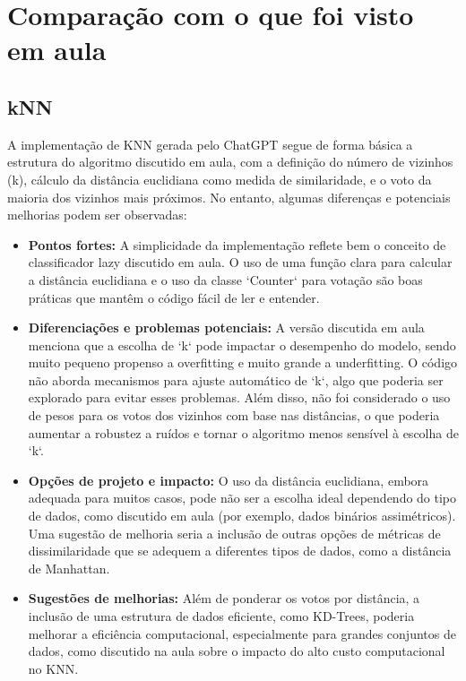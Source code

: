 \documentclass[12pt]{article}
\begin{document}
\section{Comparação com o que foi visto em aula}
\label{sec:comparacao}

\subsection{kNN}

A implementação de KNN gerada pelo ChatGPT segue de forma básica a estrutura do algoritmo discutido em aula, com a definição do número de vizinhos (k), cálculo da distância euclidiana como medida de similaridade, e o voto da maioria dos vizinhos mais próximos. No entanto, algumas diferenças e potenciais melhorias podem ser observadas:

\begin{itemize}
    \item \textbf{Pontos fortes:} A simplicidade da implementação reflete bem o conceito de classificador lazy discutido em aula. O uso de uma função clara para calcular a distância euclidiana e o uso da classe `Counter` para votação são boas práticas que mantêm o código fácil de ler e entender.
    
    \item \textbf{Diferenciações e problemas potenciais:} A versão discutida em aula menciona que a escolha de `k` pode impactar o desempenho do modelo, sendo muito pequeno propenso a overfitting e muito grande a underfitting. O código não aborda mecanismos para ajuste automático de `k`, algo que poderia ser explorado para evitar esses problemas. Além disso, não foi considerado o uso de pesos para os votos dos vizinhos com base nas distâncias, o que poderia aumentar a robustez a ruídos e tornar o algoritmo menos sensível à escolha de `k`.

    \item \textbf{Opções de projeto e impacto:} O uso da distância euclidiana, embora adequada para muitos casos, pode não ser a escolha ideal dependendo do tipo de dados, como discutido em aula (por exemplo, dados binários assimétricos). Uma sugestão de melhoria seria a inclusão de outras opções de métricas de dissimilaridade que se adequem a diferentes tipos de dados, como a distância de Manhattan.
    
    \item \textbf{Sugestões de melhorias:} Além de ponderar os votos por distância, a inclusão de uma estrutura de dados eficiente, como KD-Trees, poderia melhorar a eficiência computacional, especialmente para grandes conjuntos de dados, como discutido na aula sobre o impacto do alto custo computacional no KNN.
\end{itemize}
\end{document}
